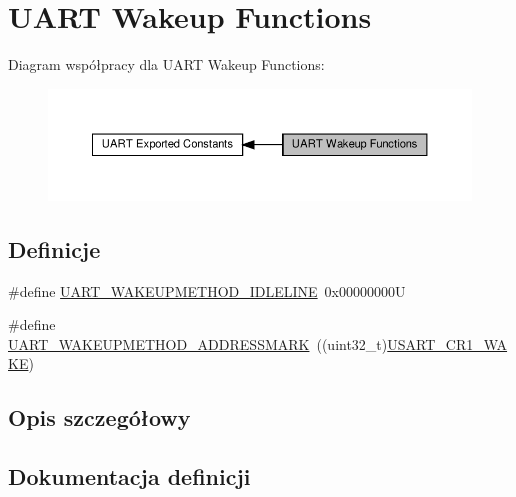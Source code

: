 \hypertarget{group___u_a_r_t___wake_up__functions}{}\section{U\+A\+RT Wakeup Functions}
\label{group___u_a_r_t___wake_up__functions}
Diagram współpracy dla U\+A\+RT Wakeup Functions\+:\nopagebreak
\begin{figure}[H]
\begin{center}
\leavevmode
\includegraphics[width=350pt]{group___u_a_r_t___wake_up__functions}
\end{center}
\end{figure}
\subsection*{Definicje}
\begin{DoxyCompactItemize}
\item 
\#define \hyperlink{group___u_a_r_t___wake_up__functions_ga2411ed44c5d82db84c5819e1e2b5b8b3}{U\+A\+R\+T\+\_\+\+W\+A\+K\+E\+U\+P\+M\+E\+T\+H\+O\+D\+\_\+\+I\+D\+L\+E\+L\+I\+NE}~0x00000000U
\item 
\#define \hyperlink{group___u_a_r_t___wake_up__functions_ga4c6935f26f8f2a9fe70fd6306a9882cb}{U\+A\+R\+T\+\_\+\+W\+A\+K\+E\+U\+P\+M\+E\+T\+H\+O\+D\+\_\+\+A\+D\+D\+R\+E\+S\+S\+M\+A\+RK}~((uint32\+\_\+t)\hyperlink{group___peripheral___registers___bits___definition_gad831dfc169fcf14b7284984dbecf322d}{U\+S\+A\+R\+T\+\_\+\+C\+R1\+\_\+\+W\+A\+KE})
\end{DoxyCompactItemize}


\subsection{Opis szczegółowy}


\subsection{Dokumentacja definicji}
\mbox{\label{group___u_a_r_t___wake_up__functions_ga4c6935f26f8f2a9fe70fd6306a9882cb}} 
